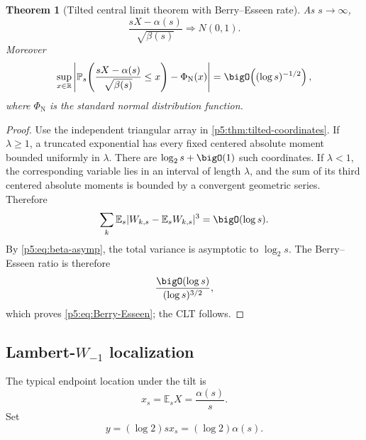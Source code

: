 \documentclass[11pt]{article}
\numberwithin{equation}{section}
\newtheorem{theorem}{Theorem}[section]
\theoremstyle{definition}
\theoremstyle{remark}
\newcommand{\R}{\mathbb R}
\newcommand{\E}{\mathbb E}
\newcommand{\Prob}{\mathbb P}
\begin{document}
\begin{theorem}[Tilted central limit theorem with Berry--Esseen rate]
\label{p5:thm:tilted-CLT}
As $s\to\infty$,
\begin{equation}\label{p5:eq:tilted-CLT}
 \frac{sX-\alpha(s)}{\sqrt{\beta(s)}}
 \Longrightarrow N(0,1).
\end{equation}
Moreover
\begin{equation}\label{p5:eq:Berry-Esseen}
 \sup_{x\in\R}
 \left|\Prob_s\!\left(
 \frac{sX-\alpha(s)}{\sqrt{\beta(s)}}\le x\right)-\Phi_{\mathrm N}(x)\right|
 =\bigO\!\left((\log s)^{-1/2}\right),
\end{equation}
where $\Phi_{\mathrm N}$ is the standard normal distribution function.
\end{theorem}

\begin{proof}
Use the independent triangular array in \cref{p5:thm:tilted-coordinates}.  If
$\lambda\ge1$, a truncated exponential has every fixed centered absolute
moment bounded uniformly in $\lambda$.  There are $\log_2s+\bigO(1)$ such
coordinates.  If $\lambda<1$, the corresponding variable lies in an interval
of length $\lambda$, and the sum of its third centered absolute moments is
bounded by a convergent geometric series.  Therefore
\begin{equation}\label{p5:eq:third-abs-sum}
 \sum_k\E_s|W_{k,s}-\E_sW_{k,s}|^3=\bigO(\log s).
\end{equation}
By \cref{p5:eq:beta-asymp}, the total variance is asymptotic to $\log_2s$.
The Berry--Esseen ratio is therefore
\[
 \frac{\bigO(\log s)}{(\log s)^{3/2}},
\]
which proves \cref{p5:eq:Berry-Esseen}; the CLT follows.
\end{proof}

\subsection{Lambert-$W_{-1}$ localization}

The typical endpoint location under the tilt is
\begin{equation}\label{p5:eq:xs}
 x_s=\E_sX=\frac{\alpha(s)}s.
\end{equation}
Set
\begin{equation}\label{p5:eq:y-def}
 y=(\log2)sx_s=(\log2)\alpha(s).
\end{equation}
\end{document}
